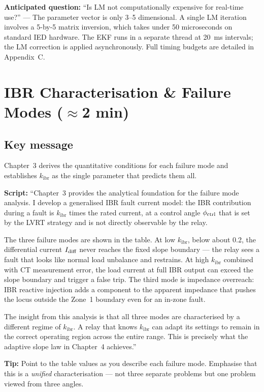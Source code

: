 \documentclass[11pt,a4paper]{article}
\newcommand{\script}[1]{\begin{scriptbox}\textbf{Script:} #1\end{scriptbox}}
\newcommand{\tip}[1]{\begin{tipbox}\textbf{Tip:} #1\end{tipbox}}
\newcommand{\anticipate}[1]{\begin{warnbox}\textbf{Anticipated question:} #1\end{warnbox}}
\newcommand{\kibr}{k_{\mathrm{ibr}}}
\begin{document}
\anticipate{``Is LM not computationally expensive for real-time use?'' ---
The parameter vector is only 3--5 dimensional. A single LM iteration involves a 5-by-5
matrix inversion, which takes under 50 microseconds on standard IED hardware. The EKF
runs in a separate thread at 20~ms intervals; the LM correction is applied asynchronously.
Full timing budgets are detailed in Appendix~C.}

\section{IBR Characterisation \& Failure Modes \hfill\normalfont\small($\approx$2 min)}
\label{slide:ibr}

\subsection*{Key message}
Chapter~3 derives the quantitative conditions for each failure mode and establishes
$\kibr$ as the single parameter that predicts them all.

\script{%
``Chapter~3 provides the analytical foundation for the failure mode analysis. I develop
a generalised IBR fault current model: the IBR contribution during a fault is $\kibr$
times the rated current, at a control angle $\phi_{\rm ctrl}$ that is set by the LVRT
strategy and is not directly observable by the relay.

The three failure modes are shown in the table. At low $\kibr$, below about 0.2, the
differential current $I_{\rm diff}$ never reaches the fixed slope boundary --- the relay
sees a fault that looks like normal load unbalance and restrains. At high $\kibr$ combined
with CT measurement error, the load current at full IBR output can exceed the slope
boundary and trigger a false trip. The third mode is impedance overreach: IBR reactive
injection adds a component to the apparent impedance that pushes the locus outside the
Zone~1 boundary even for an in-zone fault.

The insight from this analysis is that all three modes are characterised by a different
regime of $\kibr$. A relay that knows $\kibr$ can adapt its settings to remain in the
correct operating region across the entire range. This is precisely what the adaptive
slope law in Chapter~4 achieves.''%
}

\tip{Point to the table values as you describe each failure mode. Emphasise that this
is a \emph{unified} characterisation --- not three separate problems but one problem
viewed from three angles.}
\end{document}
